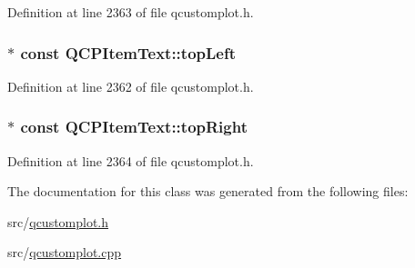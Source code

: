 Definition at line 2363 of file qcustomplot.\-h.

\hypertarget{class_q_c_p_item_text_a6354d8762182a3502103fabe5fbb8512}{
\subsubsection[{top\-Left}]{$\ast$ const Q\-C\-P\-Item\-Text\-::top\-Left}}\label{class_q_c_p_item_text_a6354d8762182a3502103fabe5fbb8512}


Definition at line 2362 of file qcustomplot.\-h.

\hypertarget{class_q_c_p_item_text_ad18ac45cb4cc135de1eb78f2e86b6504}{
\subsubsection[{top\-Right}]{$\ast$ const Q\-C\-P\-Item\-Text\-::top\-Right}}\label{class_q_c_p_item_text_ad18ac45cb4cc135de1eb78f2e86b6504}


Definition at line 2364 of file qcustomplot.\-h.



The documentation for this class was generated from the following files\-:\begin{DoxyCompactItemize}
\item 
src/\hyperlink{qcustomplot_8h}{qcustomplot.\-h}\item 
src/\hyperlink{qcustomplot_8cpp}{qcustomplot.\-cpp}\end{DoxyCompactItemize}
